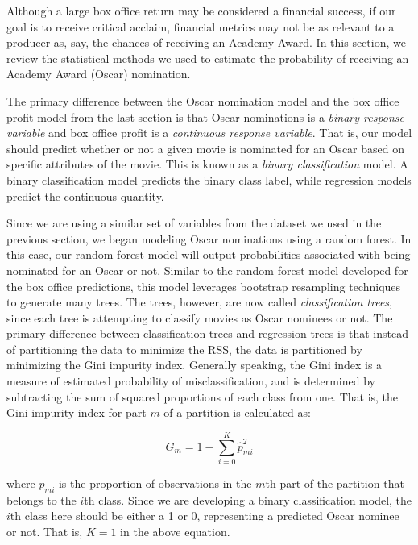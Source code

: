 \documentclass[10pt]{article}
\begin{document}
Although a large box office return may be considered a financial success, if our goal is to receive critical acclaim, financial metrics may not be as relevant to a producer as, say, the chances of receiving an Academy Award. In this section, we review the statistical methods we used to estimate the probability of receiving an Academy Award (Oscar) nomination.

The primary difference between the Oscar nomination model and the box office profit model from the last section is that Oscar nominations is a \textit{binary response variable} and box office profit is a \textit{continuous response variable}. That is, our model should predict whether or not a given movie is nominated for an Oscar based on specific attributes of the movie. This is known as a \textit{binary classification} model. A binary classification model predicts the binary class label, while regression models predict the continuous quantity.

Since we are using a similar set of variables from the dataset we used in the previous section, we began modeling Oscar nominations using a random forest. In this case, our random forest model will output probabilities associated with being nominated for an Oscar or not. Similar to the random forest model developed for the box office predictions, this model leverages bootstrap resampling techniques to generate many trees. The trees, however, are now called \textit{classification trees}, since each tree is attempting to classify movies as Oscar nominees or not. The primary difference between classification trees and regression trees is that instead of partitioning the data to minimize the RSS, the data is partitioned by minimizing the Gini impurity index. Generally speaking, the Gini index is a measure of estimated probability of misclassification, and is determined by subtracting the sum of squared proportions of each class from one. That is, the Gini impurity index for part $m$ of a partition is calculated as:

$$G_{m} = 1-\sum_{i=0}^{K} \hat{p}_{m i}^{2}$$

where $\hat{p}_{m i}$ is the proportion of observations in the $m$th part of the partition that belongs to the $i$th class. Since we are developing a binary classification model, the $i$th class here should be either a 1 or 0, representing a predicted Oscar nominee or not. That is, $K=1$ in the above equation.
\end{document}
